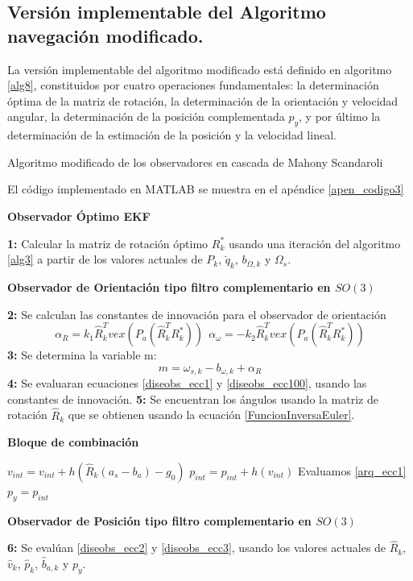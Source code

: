 \documentclass[10pt]{report}
\numberwithin{equation}{chapter}
\numberwithin{algorithm}{chapter}
\begin{document}
\subsection{Versión implementable del Algoritmo navegación modificado.}
La versión implementable del algoritmo modificado está definido en algoritmo \ref{alg8}, constituidos por cuatro operaciones fundamentales: la determinación óptima de la matriz de rotación, la determinación de la orientación y velocidad angular, la determinación de la posición complementada $p_y$, y por último la determinación de la estimación de la posición y la velocidad lineal.
\begin{algorithm}
\caption{Algoritmo modificado de los observadores en cascada de Mahony Scandaroli}
\scriptsize{El código implementado en MATLAB se muestra en el apéndice \ref{apen_codigo3}}
\label{alg8}
\begin{algorithmic}\footnotesize
\State \begin{center}\textbf{Observador Óptimo EKF}\end{center} \textbf{1:} Calcular la matriz de rotación óptimo $R^*_k$ usando una iteración del algoritmo \ref{alg3} a partir de los valores actuales de $P_k$, $\breve{q}_k$, $b_{\Omega,k}$ y $\Omega_s$.
\State \begin{center}\textbf{Observador de Orientación tipo filtro complementario en $SO(3)$}\end{center}
\State \textbf{2:} Se calculan las constantes de innovación para el observador de orientación $$\alpha_R=k_1\hat{R}_k^Tvex(P_a(\hat{R}_k^TR^*_k))~~ \alpha_\omega=-k_2\hat{R}_k^Tvex(P_a(\hat{R}_k^TR^*_k))$$
\State \textbf{3:} Se determina la variable m: $$m=\omega_{s,k}-b_{\omega,k}+ \alpha_R$$
\State \textbf{4:} Se evaluaran ecuaciones \ref{diseobs_ecc1} y \ref{diseobs_ecc100}, usando las constantes de innovación.
\State \textbf{5:} Se encuentran los ángulos usando la matriz de rotación $\hat{R}_k$ que se obtienen usando la ecuación \eqref{FuncionInversaEuler}.
\State \begin{center}\textbf{Bloque de combinación}\end{center}
\State $v_{int}=v_{int}+h(\hat{R}_k(a_s-b_a)-g_0)$
\State $p_{int}=p_{int}+h(v_{int})$
\State Evaluamos \ref{arq_ecc1}
\Else 
\State $p_y=p_{int}$
\EndIf
\State \begin{center}\textbf{Observador de Posición tipo filtro complementario en $SO(3)$}\end{center}
\State \textbf{6:} Se evalúan \ref{diseobs_ecc2} y \ref{diseobs_ecc3}, usando los valores actuales de $\hat{R}_k$, $\hat{v}_k$, $\hat{p}_k$, $\hat{b}_{a,k}$ y $p_y$.
\end{algorithmic}\normalsize
\end{algorithm}
\end{document}

